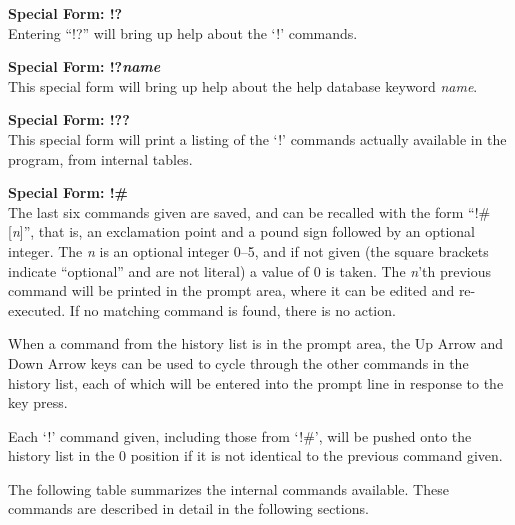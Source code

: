 {\bf Special Form:  !?}\\
Entering ``{\cb !?}'' will bring up help about the `{\cb !}' commands.

{\bf Special Form:  !?{\it name}}\\
This special form will bring up help about the help database keyword
{\it name}.

{\bf Special Form:  !??}\\
This special form will print a listing of the `!' commands 
actually available in the program, from internal tables.

{\bf Special Form:  !\#}\\
The last six commands given are saved, and can be recalled with the
form ``{\cb !\#}[{\it n\/}]'', that is, an exclamation point and a
pound sign followed by an optional integer.  The {\it n} is an
optional integer 0--5, and if not given (the square brackets indicate
``optional'' and are not literal) a value of 0 is taken.  The {\it
n\/}'th previous command will be printed in the prompt area, where it
can be edited and re-executed.  If no matching command is found, there
is no action.
       
When a command from the history list is in the prompt area, the {\kb
Up Arrow} and {\kb Down Arrow} keys can be used to cycle through the
other commands in the history list, each of which will be entered into
the prompt line in response to the key press.

Each `{\cb !}' command given, including those from `{\cb !\#}', will
be pushed onto the history list in the 0 position if it is not
identical to the previous command given.

\newpage

The following table summarizes the internal commands available.  These
commands are described in detail in the following sections.


